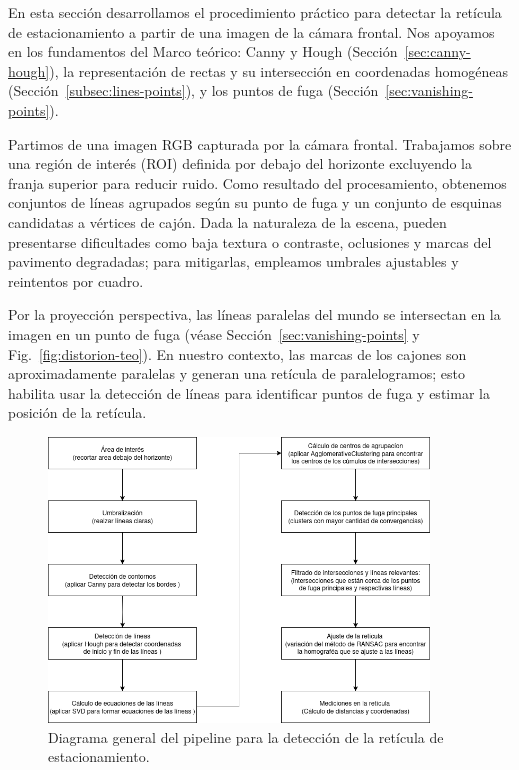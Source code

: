 
En esta sección desarrollamos el procedimiento práctico para detectar la
retícula de estacionamiento a partir de una imagen de la cámara frontal.
Nos apoyamos en los fundamentos del Marco teórico: Canny y Hough (Sección~\ref{sec:canny-hough}),
la representación de rectas y su intersección en coordenadas homogéneas
(Sección~\ref{subsec:lines-points}), y los puntos de fuga (Sección~\ref{sec:vanishing-points}).

Partimos de una imagen RGB capturada por la cámara frontal. Trabajamos sobre una región de interés (ROI)
definida por debajo del horizonte excluyendo la franja superior para reducir ruido.
Como resultado del procesamiento, obtenemos conjuntos de líneas agrupados según su punto de fuga y un conjunto de esquinas candidatas a vértices de cajón. Dada la naturaleza de la escena, pueden presentarse dificultades como baja textura o contraste, oclusiones y marcas del pavimento degradadas; para mitigarlas, empleamos umbrales ajustables y reintentos por cuadro.


Por la proyección perspectiva, las líneas paralelas del mundo se intersectan en la imagen en un punto de fuga
(véase Sección~\ref{sec:vanishing-points} y Fig.~\ref{fig:distorion-teo}).
En nuestro contexto, las marcas de los cajones son aproximadamente paralelas y generan
una retícula de paralelogramos; esto habilita usar la detección de líneas para identificar puntos de fuga
y estimar la posición de la retícula.


\begin{figure}[!ht]
    \centering
    \includegraphics[width=0.9\textwidth]{img/3-metodo/piperline-reticule1.png}
    \caption{Diagrama general del pipeline para la detección de la retícula de estacionamiento.}
    \label{fig:reticula-pipeline}
\end{figure}


